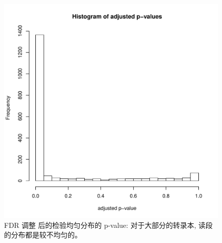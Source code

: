 \begin{figure}[!t]
\centering
\includegraphics[width=\textwidth]{figures/nonunif/padj-hist.pdf}
\caption[FDR 调整 \cite{benjamini1995controlling} 后的检验均匀分布的 p-value]
{FDR 调整 \cite{benjamini1995controlling} 后的检验均匀分布的 p-value: 
对于大部分的转录本, 读段的分布都是较不均匀的。}
\label{nonunif-adj-unif-pval}
\end{figure}

%





